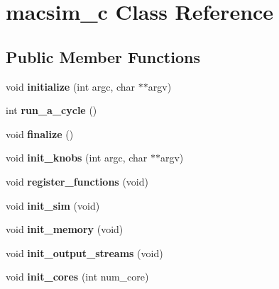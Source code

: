 \hypertarget{classmacsim__c}{
\section{macsim\_\-c Class Reference}
\label{classmacsim__c}
}
\subsection*{Public Member Functions}
\begin{DoxyCompactItemize}
\item 
\hypertarget{classmacsim__c_a7b5f3fe3b4443634b6462a9e07759c84}{
void {\bfseries initialize} (int argc, char $\ast$$\ast$argv)}
\label{classmacsim__c_a7b5f3fe3b4443634b6462a9e07759c84}

\item 
\hypertarget{classmacsim__c_a0ec4f9b71852bdfc3e51348bad0f859b}{
int {\bfseries run\_\-a\_\-cycle} ()}
\label{classmacsim__c_a0ec4f9b71852bdfc3e51348bad0f859b}

\item 
\hypertarget{classmacsim__c_a3466db9d65a3361bd0c92866f6d18391}{
void {\bfseries finalize} ()}
\label{classmacsim__c_a3466db9d65a3361bd0c92866f6d18391}

\item 
\hypertarget{classmacsim__c_a45d3cd10b6ec98efbbb8f0a09495bcbb}{
void {\bfseries init\_\-knobs} (int argc, char $\ast$$\ast$argv)}
\label{classmacsim__c_a45d3cd10b6ec98efbbb8f0a09495bcbb}

\item 
\hypertarget{classmacsim__c_ac92135ddc31916bff6ecb3f53b8d1219}{
void {\bfseries register\_\-functions} (void)}
\label{classmacsim__c_ac92135ddc31916bff6ecb3f53b8d1219}

\item 
\hypertarget{classmacsim__c_a06cf61c8e5a9ab69de0f4f0a49d835b1}{
void {\bfseries init\_\-sim} (void)}
\label{classmacsim__c_a06cf61c8e5a9ab69de0f4f0a49d835b1}

\item 
\hypertarget{classmacsim__c_af66a7ca3a835c9944ea73bcd3df53a78}{
void {\bfseries init\_\-memory} (void)}
\label{classmacsim__c_af66a7ca3a835c9944ea73bcd3df53a78}

\item 
\hypertarget{classmacsim__c_a13f56dcf93b56649f8bfbc9c3f843fb8}{
void {\bfseries init\_\-output\_\-streams} (void)}
\label{classmacsim__c_a13f56dcf93b56649f8bfbc9c3f843fb8}

\item 
\hypertarget{classmacsim__c_aa555d9c437870964d46bdf3ce520a17e}{
void {\bfseries init\_\-cores} (int num\_\-core)}
\label{classmacsim__c_aa555d9c437870964d46bdf3ce520a17e}


\end{DoxyCompactItemize}
